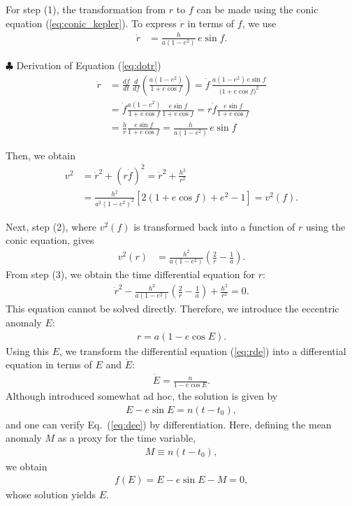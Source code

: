 For step (1), the transformation from $r$ to $f$ can be made using the conic equation (\ref{eq:conic_kepler}). To express $\dot{r}$ in terms of $f$, we use
\begin{align}
\label{eq:dotr}
\dot{r} &= \frac{h}{a(1-e^{2})} \, e\sin f .
\end{align}

\begin{itembox}{$\clubsuit$ Derivation of Equation (\ref{eq:dotr})}
\footnotesize
\color{gray}
\begin{align}
    \dot r
  &=\frac{df}{dt}
   \,\frac{d}{df}\!
     \left(
       \frac{a(1-e^{2})}{1+e\cos f}
     \right)
  =\dot f\,
    \frac{a(1-e^{2})\,e\sin f}{\bigl(1+e\cos f\bigr)^{2}}
    \nonumber \\
    &= \dot{f} \frac{a (1-e^2)}{1 + e \cos{f}} \frac{e \sin{f}}{1 + e \cos{f}} = r \dot{f} \frac{e \sin{f}}{1 + e \cos{f}} \nonumber\\
&= \frac{h}{r} \frac{e \sin{f}}{1 + e \cos{f}}
= \frac{h}{a(1-e^{2})}\,e\sin f
\end{align}
\end{itembox}

Then, we obtain
\begin{align}
    v^2 &= \dot{r}^2 + (r \dot{f})^2 = \dot{r}^2 + \frac{h^2}{r^2} \nonumber \\
    &= \frac{h^2}{a^2(1-e^2)^2} [2 (1 + e\cos{f}) + e^2 - 1 ] = v^2(f).
\end{align}


Next, step (2), where $v^2(f)$ is transformed back into a function of $r$ using the conic equation, gives
\begin{align}
v^2(r) &= \frac{h^2}{a (1 - e^2)} \left( \frac{2}{r} - \frac{1}{a} \right) .
\end{align}
From step (3), we obtain the time differential equation for $r$:
\begin{align}
\label{eq:rde}
\dot{r}^2 - \frac{h^2}{a (1-e^2)} \left( \frac{2}{r} - \frac{1}{a} \right) + \frac{h^2}{r^2} = 0 .
\end{align}
This equation cannot be solved directly. Therefore, we introduce the eccentric anomaly $E$:
\begin{align}
\label{eq:eanomaly}
r = a (1 - e \cos{E}) .
\end{align}
Using this $E$, we transform the differential equation (\ref{eq:rde}) into a differential equation in terms of $E$ and $\dot{E}$:
\begin{align}
\label{eq:dee}
\dot{E} = \frac{n}{1 - e \cos{E}} .
\end{align}
Although introduced somewhat ad hoc, the solution is given by
\begin{align}
E - e \sin{E} = n (t -t_0) ,
\end{align}
and one can verify Eq.~(\ref{eq:dee}) by differentiation. Here, defining the mean anomaly $M$ as a proxy for the time variable,
\begin{align}
M \equiv n (t - t_0),
\end{align}
we obtain
\begin{align}
\label{eq:dee_sol_M}
f(E) = E - e \sin{E} - M = 0 ,
\end{align}
whose solution yields $E$.

